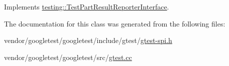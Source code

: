 Implements \hyperlink{classtesting_1_1_test_part_result_reporter_interface_aa2f920e7a5a0a6d0faf19e3727928c22}{testing\+::\+Test\+Part\+Result\+Reporter\+Interface}.



The documentation for this class was generated from the following files\+:\begin{DoxyCompactItemize}
\item 
vendor/googletest/googletest/include/gtest/\hyperlink{gtest-spi_8h}{gtest-\/spi.\+h}\item 
vendor/googletest/googletest/src/\hyperlink{gtest_8cc}{gtest.\+cc}\end{DoxyCompactItemize}
